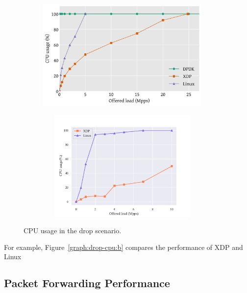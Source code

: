 \documentclass[12pt,titlepage]{article}
\begin{document}
\begin{figure}
    \centering
    \begin{minipage}{0.49\textwidth}
        \centering
        \includegraphics[width=0.95\textwidth,height=5.5cm]{original/drop-cpu.pdf} %
        \label{graph:drop-cpu:a}
    \end{minipage}\hfill
    \begin{minipage}{0.49\textwidth}
        \centering
        \includegraphics[width=0.95\textwidth,height=5.5cm]{img/drop-cpu.pdf} %
        \label{graph:drop-cpu:b}
    \end{minipage}
     \caption{CPU usage in the drop scenario.}
     \label{graph:drop-cpu}
\end{figure}

For example, Figure~\ref{graph:drop-cpu:b} compares the performance of XDP and Linux


\subsection{Packet Forwarding Performance}
\end{document}
